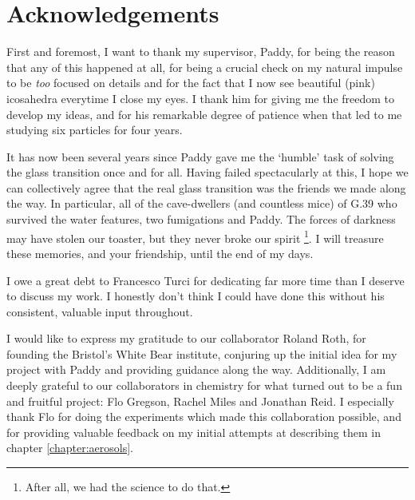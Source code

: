 
\chapter*{\vspace{-1em} Acknowledgements}

First and foremost, I want to thank my supervisor, Paddy, for being the reason that any of this happened at all, for being a crucial check on my natural impulse to be \emph{too} focused on details and for the fact that I now see beautiful (pink) icosahedra everytime I close my eyes.
I thank him for giving me the freedom to develop my ideas, and for his remarkable degree of patience when that led to me studying six particles for four years.

It has now been several years since Paddy gave me the `humble' task of solving the glass transition once and for all.
Having failed spectacularly at this, I hope we can collectively agree that the real glass transition was the friends we made along the way.
In particular, all of the cave-dwellers (and countless mice) of G.39 who survived the water features, two fumigations and Paddy.
The forces of darkness may have stolen our toaster, but they never broke our spirit%
\footnote{After all, we had the science to do that.}.
I will treasure these memories, and your friendship, until the end of my days.

I owe a great debt to Francesco Turci for dedicating far more time than I deserve to discuss my work.
I honestly don't think I could have done this without his consistent, valuable input throughout.

I would like to express my gratitude to our collaborator Roland Roth, for founding the Bristol's White Bear institute, conjuring up the initial idea for my project with Paddy and providing guidance along the way.
Additionally, I am deeply grateful to our collaborators in chemistry for what turned out to be a fun and fruitful project: Flo Gregson, Rachel Miles and Jonathan Reid.
I especially thank Flo for doing the experiments which made this collaboration possible, and for providing valuable feedback on my initial attempts at describing them in chapter \ref{chapter:aerosols}.

